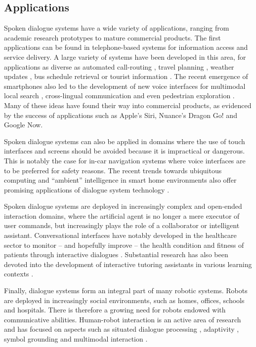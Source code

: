 \subsection{Applications}

Spoken dialogue systems have a wide variety of applications, ranging from academic research prototypes to mature commercial products. The first applications can be found in telephone-based systems for information access and service delivery.  A large variety of systems have been developed in this area, for applications as diverse as automated call-routing \citep{GorinRW97}, travel planning \citep{walker2001}, weather updates \citep{jupiter}, bus schedule retrieval \citep{RauxLBBE05} or tourist information \citep{lemon2006}.  The recent emergence of smartphones also led to the development of new voice interfaces for multimodal local search \citep{EhlenJ13}, cross-lingual communication \citep{yochina} and even pedestrian exploration  \citep{janarthanam2012integrating}.  Many of these ideas have found their way into commercial products, as evidenced by the success of applications such as Apple's Siri, Nuance's Dragon Go! and Google Now. 

Spoken dialogue systems can also be applied in domains where the use of touch interfaces and screens should be avoided because it is impractical or dangerous.  This is notably the case for in-car navigation systems \citep{cumove,CastronovoMPM10} where voice interfaces are to be preferred for safety reasons.  The recent trends towards ubiquitous computing and ``ambient'' intelligence in smart home environments also offer promising applications of dialogue system technology \citep{vipperla2009a,ambient2010}.

Spoken dialogue systems are deployed in increasingly complex and open-ended interaction domains, where the artificial agent is no longer a mere executor of user commands, but increasingly plays the role of a collaborator or intelligent assistant.  Conversational interfaces have notably developed in the healthcare sector to monitor -- and hopefully improve -- the health condition and fitness of patients through interactive dialogues \citep{BickmoreG06,Stahl:2009,MorbiniFDSTR12}.  Substantial research has also been devoted into the development of interactive tutoring assistants in various learning contexts \citep{ChiVLJ11,Dzikovska:2011,jan2011,TraumAAFGKLNS12}. 

Finally, dialogue systems form an integral part of many robotic systems.  Robots are deployed in increasingly social environments, such as homes, offices, schools and hospitals.  There is therefore a growing need for robots endowed with communicative abilities. Human-robot interaction is an active area of research and has focused on aspects such as situated dialogue processing \citep{CantrellSSW10,cosybook:dialogue}, adaptivity \citep{DoshiR08}, symbol grounding \citep{Roy05,lemaignan2012} and multimodal interaction \citep{stiefelhagen2004,salem2012,MirnigWSMGBGT13}.
 
